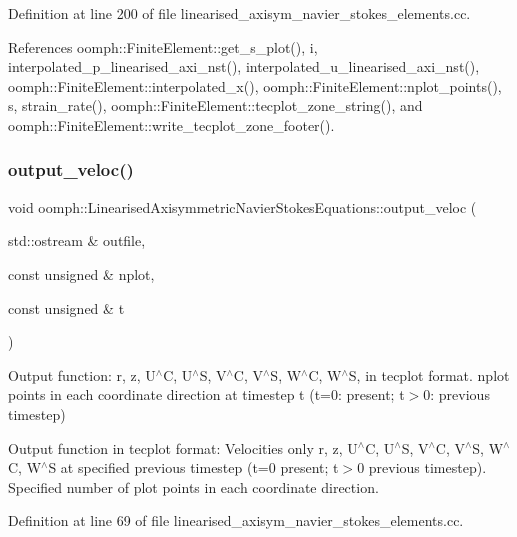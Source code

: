 Definition at line 200 of file linearised\+\_\+axisym\+\_\+navier\+\_\+stokes\+\_\+elements.\+cc.



References oomph\+::\+Finite\+Element\+::get\+\_\+s\+\_\+plot(), i, interpolated\+\_\+p\+\_\+linearised\+\_\+axi\+\_\+nst(), interpolated\+\_\+u\+\_\+linearised\+\_\+axi\+\_\+nst(), oomph\+::\+Finite\+Element\+::interpolated\+\_\+x(), oomph\+::\+Finite\+Element\+::nplot\+\_\+points(), s, strain\+\_\+rate(), oomph\+::\+Finite\+Element\+::tecplot\+\_\+zone\+\_\+string(), and oomph\+::\+Finite\+Element\+::write\+\_\+tecplot\+\_\+zone\+\_\+footer().

\mbox{\label{classoomph_1_1LinearisedAxisymmetricNavierStokesEquations_a94f9c04c4a728232376794e1ae415ade}} 
\subsubsection{\texorpdfstring{output\+\_\+veloc()}{output\_veloc()}}
{\footnotesize\ttfamily void oomph\+::\+Linearised\+Axisymmetric\+Navier\+Stokes\+Equations\+::output\+\_\+veloc (\begin{DoxyParamCaption}\item[{std\+::ostream \&}]{outfile,  }\item[{const unsigned \&}]{nplot,  }\item[{const unsigned \&}]{t }\end{DoxyParamCaption})}



Output function\+: r, z, U$^\wedge$C, U$^\wedge$S, V$^\wedge$C, V$^\wedge$S, W$^\wedge$C, W$^\wedge$S, in tecplot format. nplot points in each coordinate direction at timestep t (t=0\+: present; t$>$0\+: previous timestep) 

Output function in tecplot format\+: Velocities only r, z, U$^\wedge$C, U$^\wedge$S, V$^\wedge$C, V$^\wedge$S, W$^\wedge$C, W$^\wedge$S at specified previous timestep (t=0 present; t$>$0 previous timestep). Specified number of plot points in each coordinate direction. 

Definition at line 69 of file linearised\+\_\+axisym\+\_\+navier\+\_\+stokes\+\_\+elements.\+cc.



